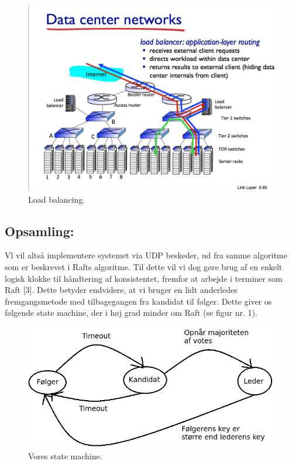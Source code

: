 \documentclass[a4paper,12pt]{article}
\begin{document}
\begin{figure}[H]
  \caption{Load balancing.}
  \centering
    \includegraphics[width=1\textwidth]{Loadbalancing}
\end{figure}



\subsection{Opsamling:}
Vl vil altså implementere systemet via UDP beskeder, ud fra samme algoritme som er beskrevet i Rafts algoritme. Til dette vil vi dog gøre brug af en enkelt logisk klokke til håndtering af konsistentet, fremfor at arbejde i terminer som Raft [3]. Dette betyder endvidere, at vi bruger en lidt anderledes fremgangsmetode med tilbagegangen fra kandidat til følger. Dette giver os følgende state machine, der i høj grad minder om Raft (se figur nr. 1).
\begin{figure}[H]
  \caption{Vores state machine.}
  \centering
    \includegraphics[width=1\textwidth]{State-machine.png}
\end{figure}
\end{document}
